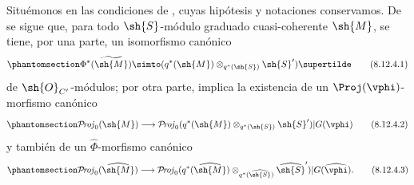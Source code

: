 \documentclass[oneside,10pt]{amsart}
\makeatletter
\newcommand{\ega@arrow}[2]{\mathchoice{#1}{#2}{#2}{#2}}
\renewcommand{\to}{\ega@arrow{\longrightarrow}{\rightarrow}}
\def\shProj{\mathcal{P}\!\mathit{roj}}
\let\EGAOriginalLabel\label
\renewcommand{\label}[1]{\phantomsection\EGAOriginalLabel{#1}}
\makeatother
\begin{document}
\begin{env}[8.12.4]
\label{II.8.12.4}
Situémonos en las condiciones de , cuyas hipótesis y notaciones conservamos.
De  se sigue que, para todo $\sh{S}$-módulo graduado cuasi-coherente $\sh{M}$, se tiene, por una parte, un isomorfismo canónico
\[
\label{II.8.12.4.1}
    \Phi^*(\widetilde{\sh{M}}) \simto (q^*(\sh{M})\otimes_{q^*(\sh{S})}\sh{S}')\supertilde
\tag{8.12.4.1}
\]
de $\sh{O}_{C'}$-módulos;
por otra parte,  implica la existencia de un $\Proj(\vphi)$-morfismo canónico
\[
\label{II.8.12.4.2}
    \shProj_0(\sh{M}) \to \shProj_0(q^*(\sh{M})\otimes_{q^*(\sh{S})}\sh{S}')|G(\vphi)
\tag{8.12.4.2}
\]
y también de un $\widehat{\Phi}$-morfismo canónico
\[
\label{II.8.12.4.3}
    \shProj_0(\widehat{\sh{M}}) \to \shProj_0(q^*(\widehat{\sh{M}})\otimes_{q^*(\widehat{\sh{S}})}\widehat{\sh{S}}')|G(\widehat{\vphi}).
\tag{8.12.4.3}
\]
\end{env}
\end{document}
